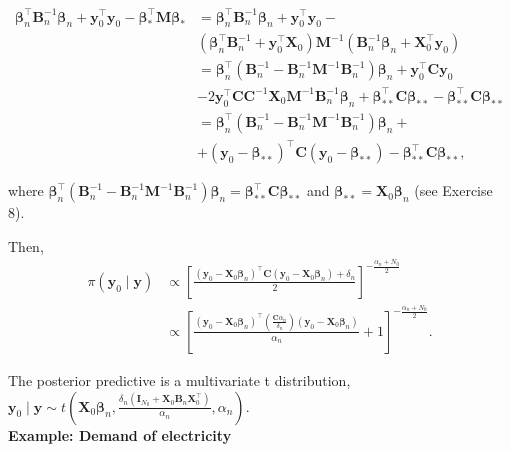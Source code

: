 \begin{align*}
	\bm{\beta}_n^{\top}{\bm{B}}_n^{-1}\bm{\beta}_n+{\bm{y}}_0^{\top}{\bm{y}}_0-\bm{\beta}_*^{\top}{\bm{M}}\bm{\beta}_*&=
	\bm{\beta}_n^{\top}{\bm{B}}_n^{-1}\bm{\beta}_n+{\bm{y}}_0^{\top}{\bm{y}}_0-\\
	&(\bm{\beta}_n^{\top}{\bm{B}}_n^{-1}+{\bm{y}}_0^{\top}{\bm{X}}_0){\bm{M}}^{-1}({\bm{B}}_n^{-1}\bm{\beta}_n+{\bm{X}}_0^{\top}{\bm{y}}_0)\\
	&=\bm{\beta}_n^{\top}({\bm{B}}_n^{-1}-{\bm{B}}_n^{-1}{\bm{M}}^{-1}{\bm{B}}_n^{-1})\bm{\beta}_n+{\bm{y}}_0^{\top}{\bm{C}}{\bm{y}}_0\\
	&-2{\bm{y}}_0^{\top}{\bm{C}}{\bm{C}}^{-1}{\bm{X}}_0{\bm{M}}^{-1}{\bm{B}}_n^{-1}\bm{\beta}_n+{\bm{\bm{\beta}}}_{**}^{\top}{\bm{C}}{\bm{\bm{\beta}}}_{**}-{\bm{\bm{\beta}}}_{**}^{\top}{\bm{C}}{\bm{\bm{\beta}}}_{**}\\
	&=\bm{\beta}_n^{\top}({\bm{B}}_n^{-1}-{\bm{B}}_n^{-1}{\bm{M}}^{-1}{\bm{B}}_n^{-1})\bm{\beta}_n+\\
	&+({\bm{y}}_0-{\bm{\bm{\beta}}}_{**})^{\top}{\bm{C}}({\bm{y}}_0-{\bm{\bm{\beta}}}_{**})-{\bm{\bm{\beta}}}_{**}^{\top}{\bm{C}}{\bm{\bm{\beta}}}_{**},
\end{align*}

where $\bm{\beta}_n^{\top}({\bm{B}}_n^{-1}-{\bm{B}}_n^{-1}{\bm{M}}^{-1}{\bm{B}}_n^{-1})\bm{\beta}_n={\bm{\bm{\beta}}}_{**}^{\top}{\bm{C}}{\bm{\bm{\beta}}}_{**}$ and $\bm{\beta}_{**}={\bm{X}}_0\bm{\beta}_n$ (see Exercise 8).

Then,
\begin{align*}
	\pi({\bm{y}}_0\mid {\bm{y}})&\propto\left[\frac{({\bm{y}}_0-{\bm{X}}_0\bm{\beta}_n)^{\top}{\bm{C}}({\bm{y}}_0-{\bm{X}}_0\bm{\beta}_n)+\delta_n}{2}\right]^{-\frac{\alpha_n+N_0}{2}}\\
	&\propto\left[\frac{({\bm{y}}_0-{\bm{X}}_0\bm{\beta}_n)^{\top}\left(\frac{{\bm{C}}\alpha_n}{\delta_n}\right)({\bm{y}}_0-{\bm{X}}_0\bm{\beta}_n)}{\alpha_n}+1\right]^{-\frac{\alpha_n+N_0}{2}}.
\end{align*}

The posterior predictive is a multivariate t distribution, ${\bm{y}}_0\mid {\bm{y}}\sim t\left({\bm{X}}_0\bm{\beta}_n,\frac{\delta_n({\bm{I}}_{N_0}+{\bm{X}}_0{\bm{B}}_n{\bm{X}}_0^{\top})}{\alpha_n},\alpha_n\right)$.\\

\textbf{Example: Demand of electricity}

